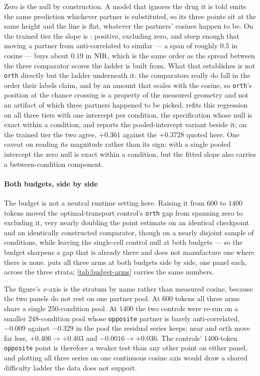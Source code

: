 Zero is the null by construction. A model that ignores the drug it is told
emits the same prediction whichever partner is substituted, so its three points
sit at the same height and the line is flat, whatever the partners' cosines
happen to be. On the trained tier the slope is :
positive, excluding zero, and steep enough that moving a partner from
anti-correlated to similar --- a span of roughly $0.5$ in cosine --- buys about
$0.19$ in $\textrm{NIR}$, which is the same order as the spread between the three
comparator scores the ladder is built from. What that establishes is not
\texttt{orth} directly but the ladder underneath it: the comparators really do
fall in the order their labels claim, and by an amount that scales with the
cosine, so \texttt{orth}'s position at the chance crossing is a property of the
measured geometry and not an artifact of which three partners happened to be
picked.  refits this regression on all three tiers with one intercept per condition, the specification whose null is exact within a condition, and reports the pooled-intercept variant beside it; on the trained tier the two agree, $+0.361$ against the $+0.3728$ quoted here. One caveat on reading its magnitude rather than its sign: with a single
pooled intercept the zero null is exact within a condition, but the fitted slope
also carries a between-condition component.


\paragraph{Both budgets, side by side} The budget is not a neutral runtime
setting here. Raising it from $600$ to $1400$ tokens moved the
optimal-transport control's \texttt{orth} gap from spanning zero to excluding
it, very nearly doubling the point estimate on an identical checkpoint and an
identically constructed comparator, though on a nearly disjoint sample of
conditions, while leaving the single-cell control null at both budgets --- so
the budget sharpens a gap that is already there and does not manufacture one
where there is none.  puts all three arms at both budgets side
by side, one panel each, across the three strata;
\cref{tab:budget-arms} carries the same numbers.

The figure's $x$-axis is the stratum by name rather than measured cosine,
because the two panels do not rest on one partner pool. At $600$ tokens all
three arms share a single $\num{250}$-condition pool. At $1400$ the two controls
were re-run on a smaller $\num{248}$-condition pool whose \texttt{opposite}
partner is barely anti-correlated, $-0.009$ against $-0.329$ in the pool the
residual series keeps; near and orth move far less, $+0.406\rightarrow+0.403$
and $-0.0016\rightarrow+0.036$. The controls' $1400$-token \texttt{opposite}
point is therefore a weaker test than any other point on either panel, and
plotting all three series on one continuous cosine axis would draw a shared
difficulty ladder the data does not support.


